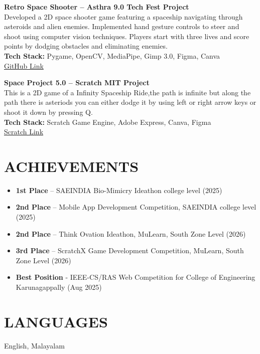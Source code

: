 \documentclass[10pt]{article}
\begin{document}
\textbf{Retro Space Shooter – Asthra 9.0 Tech Fest Project} \\
Developed a 2D space shooter game featuring a spaceship navigating through asteroids and alien enemies. Implemented hand gesture controls to steer and shoot using computer vision techniques. Players start with three lives and score points by dodging obstacles and eliminating enemies. \\
\textbf{Tech Stack:} Pygame, OpenCV, MediaPipe, Gimp 3.0, Figma, Canva \\
\href{https://github.com/deon-george/Retro_Space_shooter}{GitHub Link}

\textbf{Space Project 5.0 – Scratch MIT Project} \\
This is a 2D game of a Infinity Spaceship Ride,the path is infinite but along the path there is asteriods you can either dodge it by using left or right arrow keys or shoot it down by pressing Q. \\
\textbf{Tech Stack:} Scratch Game Engine, Adobe Express, Canva, Figma \\
\href{https://scratch.mit.edu/projects/1209027510}{Scratch Link}




\section*{ACHIEVEMENTS}

\begin{itemize}
    \item \textbf{1st Place} – SAEINDIA Bio-Mimicry Ideathon college level (2025)
    \item \textbf{2nd Place} – Mobile App Development Competition, SAEINDIA college level (2025)
    \item \textbf{2nd Place} – Think Ovation Ideathon, MuLearn, South Zone Level (2026)
    \item \textbf{3rd Place} – ScratchX Game Development Competition, MuLearn, South Zone Level (2026)
    \item \textbf{Best Position} - IEEE-CS/RAS Web Competition for College of Engineering Karunagappally (Aug 2025)
\end{itemize}


\section*{LANGUAGES}

English, Malayalam
\end{document}
